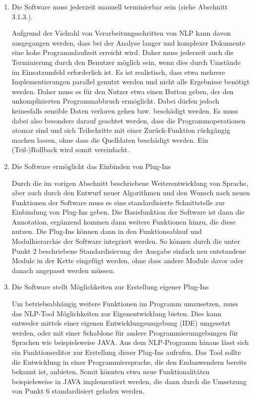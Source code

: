 \documentclass[12pt]{report}
\begin{document}
\begin{enumerate}
\item Die Software muss jederzeit manuell terminierbar sein (siehe Abschnitt 3.1.3.).

Aufgrund der Vielzahl von Verarbeitungsschritten von NLP kann davon ausgegangen werden, dass bei der Analyse langer und komplexer Dokumente eine hohe Programmlaufzeit erreicht wird. Daher muss jederzeit auch die Terminierung durch den Benutzer möglich sein, wenn dies durch Umstände im Einsatzumfeld erforderlich ist. Es ist realistisch, dass etwa mehrere Implementierungen parallel genutzt werden und nicht alle Ergebnisse benötigt werden. 
Daher muss es für den Nutzer etwa einen Button geben, der den unkomplizierten Programmabbruch ermöglicht. Dabei dürfen jedoch keinesfalls sensible Daten verloren gehen bzw. beschädigt werden. 
Es muss dabei also besonders darauf geachtet werden, dass die Programmoperationen atomar sind und sich Teilschritte mit einer Zurück-Funktion rückgängig machen lassen, ohne dass die Quelldaten beschädigt werden. Ein (Teil-)Rollback wird somit vereinfacht.

\item Die Software ermöglicht das Einbinden von Plug-Ins

Durch die im vorigen Abschnitt beschriebene Weiterentwicklung von Sprache, aber auch durch den Entwurf neuer Algorithmen und den Wunsch nach neuen Funktionen der Software muss es eine standardisierte Schnittstelle zur Einbindung von Plug-Ins geben. Die Basisfunktion der Software ist dann die Annotation, ergänzend kommen dann weitere Funktionen hinzu, die diese nutzen. Die Plug-Ins können dann in den Funktionsablauf und Modulhierarchie der Software integriert werden. So können durch die unter Punkt 2 beschriebene Standardisierung der Ausgabe einfach neu entstandene Module in der Kette eingefügt werden, ohne dass andere Module davor oder danach angepasst werden müssen.

\item Die Software stellt Möglichkeiten zur Erstellung eigener Plug-Ins

Um betriebsabhängig weitere Funktionen im Programm umzusetzen, muss das NLP-Tool Möglichkeiten zur Eigenentwicklung bieten. Dies kann entweder mittels einer eigenen Entwicklungsumgebung (IDE) umgesetzt werden, oder mit einer Schablone für andere Programmierumgebungen für Sprachen wie beispielsweise JAVA. Aus dem NLP-Programm hinaus lässt sich ein Funktionseditor zur Erstellung dieser Plug-Ins aufrufen. Das Tool sollte die Entwicklung in einer Programmiersprache, die den Endanwendern bereits bekannt ist, anbieten. Somit könnten etwa neue Funktionalitäten beispielsweise in JAVA implementiert werden, die dann durch die Umsetzung von Punkt 6 standardisiert geladen werden.


\end{enumerate}
\end{document}

